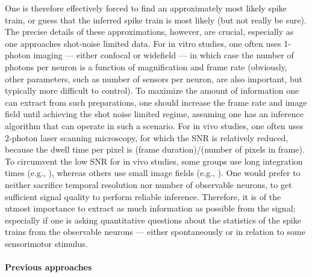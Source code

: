 One is therefore effectively forced to find an approximately most likely spike train, or guess that the inferred spike train is most likely (but not really be sure).  The precise details of these approximations, however, are crucial, especially as one approaches shot-noise limited data. For in vitro studies, one often uses 1-photon imaging --- either confocal or widefield --- in which case the number of photons per neuron is a function of magnification and frame rate (obviously, other parameters, such as number of sensors per neuron, are also important, but typically more difficult to control).  To maximize the amount of information one can extract from such preparations, one should increase the frame rate and image field until achieving the shot noise limited regime, assuming one has an inference algorithm that can operate in such a scenario.  For in vivo studies, one often uses 2-photon laser scanning microscopy, for which the SNR is relatively reduced,  because the dwell time per pixel is (frame duration)/(number of pixels in frame).  To circumvent the low SNR for in vivo studies, some groups use long integration times (e.g., \cite{OhkiReid06}), whereas others use small image fields (e.g., \cite{KerrHelmchen07}).  One would prefer to neither sacrifice temporal resolution nor number of observable neurons, to get sufficient signal quality to perform reliable inference.  Therefore, it is of the utmost importance to extract as much information as possible from the signal; especially if one is asking quantitative questions about the statistics of the spike trains from the observable neurons --- either spontaneously or in relation to some sensorimotor stimulus.

\paragraph{Previous approaches}



